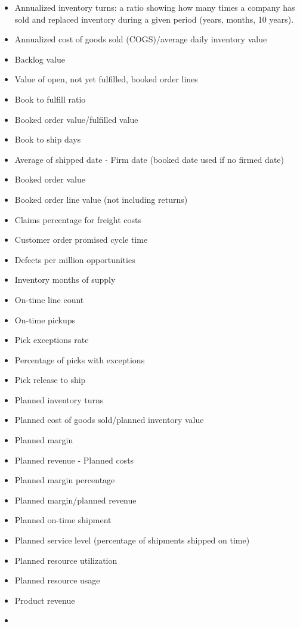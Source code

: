 \documentclass[]{book}
\providecommand{\tightlist}{%
  \setlength{\itemsep}{0pt}\setlength{\parskip}{0pt}}
\begin{document}
\begin{itemize}
\tightlist
\item
  Annualized inventory turns: a ratio showing how many times a company
  has sold and replaced inventory during a given period (years, months,
  10 years).
\item
  Annualized cost of goods sold (COGS)/average daily inventory value
\item
  Backlog value
\item
  Value of open, not yet fulfilled, booked order lines
\item
  Book to fulfill ratio
\item
  Booked order value/fulfilled value
\item
  Book to ship days
\item
  Average of shipped date - Firm date (booked date used if no firmed
  date)
\item
  Booked order value
\item
  Booked order line value (not including returns)
\item
  Claims percentage for freight costs
\item
  Customer order promised cycle time
\item
  Defects per million opportunities
\item
  Inventory months of supply
\item
  On-time line count
\item
  On-time pickups
\item
  Pick exceptions rate
\item
  Percentage of picks with exceptions
\item
  Pick release to ship
\item
  Planned inventory turns
\item
  Planned cost of goods sold/planned inventory value
\item
  Planned margin
\item
  Planned revenue - Planned costs
\item
  Planned margin percentage
\item
  Planned margin/planned revenue
\item
  Planned on-time shipment
\item
  Planned service level (percentage of shipments shipped on time)
\item
  Planned resource utilization
\item
  Planned resource usage
\item
  Product revenue
\item

\end{itemize}
\end{document}
